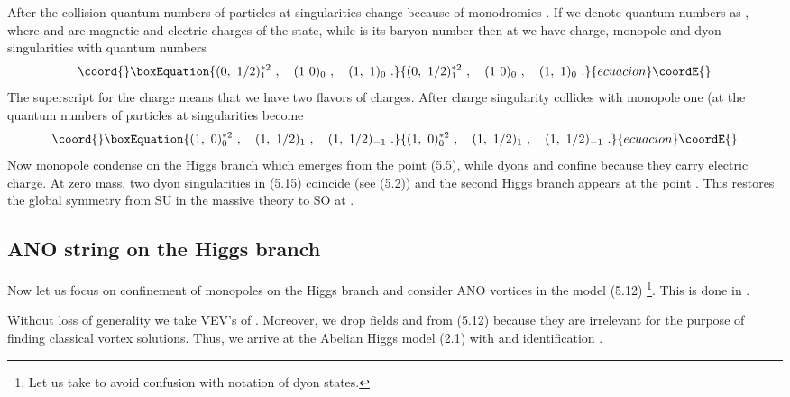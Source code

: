 \documentclass[a4paper,12pt]{article}
\begin{document}
After the collision quantum numbers of particles at
singularities change because of monodromies \cite{SW2}. If we
denote quantum numbers as \coordHE{}, where \coordHE{} and \coordHE{}
are magnetic and electric charges of the state, while \coordHE{} is its
baryon number then at \coordHE{} we have charge, monopole and
dyon singularities with quantum numbers
\begin{equation}\coord{}\boxEquation{
(0,\ 1/2)^{*2}_1\ , \quad (1\ 0)_0\ , \quad (1,\ 1)_0\ .
}{
(0,\ 1/2)^{*2}_1\ , \quad (1\ 0)_0\ , \quad (1,\ 1)_0\ .
}{ecuacion}\coordE{}\end{equation}
The superscript for the charge means that we have two flavors
of charges. After charge singularity collides with monopole one
(at \coordHE{} the quantum numbers of particles at
singularities become \cite{BF}
\begin{equation}\coord{}\boxEquation{
(1,\ 0)^{*2}_0\ , \quad (1,\ 1/2)_1\ , \quad (1,\ 1/2)_{-1}\ .
}{
(1,\ 0)^{*2}_0\ , \quad (1,\ 1/2)_1\ , \quad (1,\ 1/2)_{-1}\ .
}{ecuacion}\coordE{}\end{equation}
Now monopole \coordHE{} condense on the Higgs branch which
emerges from the point (5.5), while dyons \coordHE{} and
\coordHE{} confine because they carry electric
charge. At
zero mass, \coordHE{} two dyon singularities in (5.15) coincide (see
(5.2)) and the second Higgs branch appears at the point
\coordHE{}. This restores the global symmetry from
SU\coordHE{} in the massive theory to SO\coordHE{} at \coordHE{}
\cite{SW2}.

\subsection{ANO string on the Higgs branch}

Now let us focus on confinement of monopoles on the Higgs branch
and consider ANO vortices in the model (5.12) 
\footnote{ Let us take
\coordHE{} to avoid confusion with notation of dyon states.}.
This is done in \cite{Y}.

Without loss of generality we take VEV's of \coordHE{}  \coordHE{}. Moreover, we drop fields \coordHE{} and
\coordHE{} from (5.12) because they are irrelevant for the purpose of
finding classical vortex solutions. Thus, we arrive at the
Abelian Higgs model (2.1) with \coordHE{} and identification
\coordHE{}.
\end{document}
